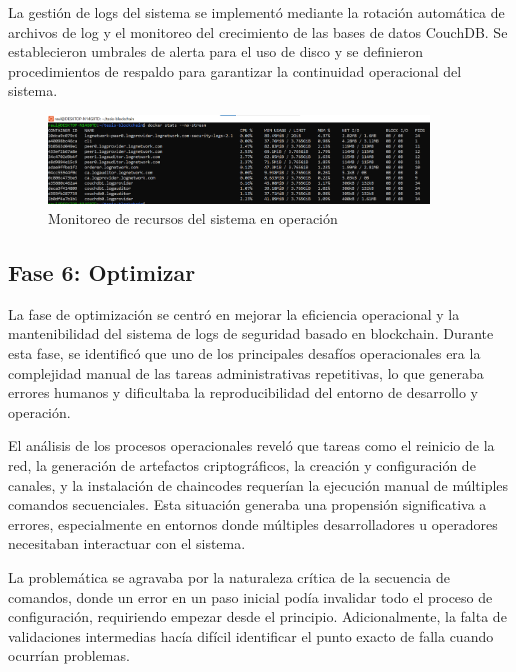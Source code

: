 La gestión de logs del sistema se implementó mediante la rotación automática de archivos de log y el monitoreo del crecimiento de las bases de datos CouchDB. Se establecieron umbrales de alerta para el uso de disco y se definieron procedimientos de respaldo para garantizar la continuidad operacional del sistema.
\begin{figure}[H]
\centering
\includegraphics[width=0.90\textwidth]{figuras/monitoreo_recursos.png}
\caption{Monitoreo de recursos del sistema en operación}
\label{fig:monitoreo-recursos}
\end{figure}


\subsection{Fase 6: Optimizar}

La fase de optimización se centró en mejorar la eficiencia operacional y la mantenibilidad del sistema de logs de seguridad basado en blockchain. Durante esta fase, se identificó que uno de los principales desafíos operacionales era la complejidad manual de las tareas administrativas repetitivas, lo que generaba errores humanos y dificultaba la reproducibilidad del entorno de desarrollo y operación.


El análisis de los procesos operacionales reveló que tareas como el reinicio de la red, la generación de artefactos criptográficos, la creación y configuración de canales, y la instalación de chaincodes requerían la ejecución manual de múltiples comandos secuenciales. Esta situación generaba una propensión significativa a errores, especialmente en entornos donde múltiples desarrolladores u operadores necesitaban interactuar con el sistema.

La problemática se agravaba por la naturaleza crítica de la secuencia de comandos, donde un error en un paso inicial podía invalidar todo el proceso de configuración, requiriendo empezar desde el principio. Adicionalmente, la falta de validaciones intermedias hacía difícil identificar el punto exacto de falla cuando ocurrían problemas.

